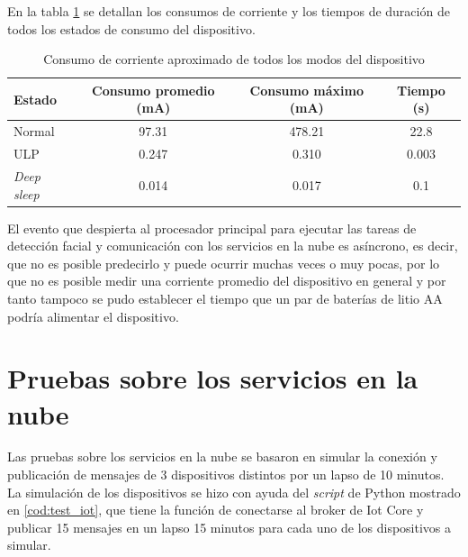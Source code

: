 En la tabla \ref{tab:test_ulp} se detallan los consumos de corriente y los tiempos de duración de todos los estados de consumo del dispositivo.

\begin{table}[h]
	\centering
	\caption[Consumo de corriente del dispositivo]{Consumo de corriente aproximado de todos los modos del dispositivo}
	\begin{tabular}{lccc}   
		\toprule
		\textbf{Estado} & \textbf{Consumo promedio (mA)} & \textbf{Consumo máximo (mA)} & \textbf{Tiempo (s)} \\
		\midrule
		Normal & 97.31 & 478.21 & 22.8 \\
		ULP & 0.247 & 0.310 & 0.003 \\
		\textit{Deep sleep} & 0.014 & 0.017 & 0.1 \\
		\bottomrule
		\hline
	\end{tabular}
	\label{tab:test_ulp}
\end{table}

El evento que despierta al procesador principal para ejecutar las tareas de detección facial y comunicación con los servicios en la nube es asíncrono, es decir, que no es posible predecirlo y puede ocurrir muchas veces o muy pocas, por lo que no es posible medir una corriente promedio del dispositivo en general y por tanto tampoco se pudo establecer el tiempo que un par de baterías de litio AA podría alimentar el dispositivo.

\section{Pruebas sobre los servicios en la nube}
Las pruebas sobre los servicios en la nube se basaron en simular la conexión y publicación de mensajes de 3 dispositivos distintos por un lapso de 10 minutos. La simulación de los dispositivos se hizo con ayuda del \textit{script} de Python mostrado en \ref{cod:test_iot}, que tiene la función de conectarse al broker de Iot Core y publicar 15 mensajes en un lapso 15 minutos para cada uno de los dispositivos a simular.

